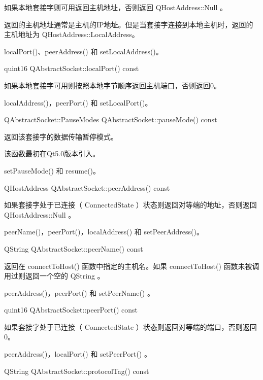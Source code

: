 如果本地套接字则可用返回主机地址，否则返回 QHostAddress::Null 。

返回的主机地址通常是主机的IP地址。但是当套接字连接到本地主机时，返回的主机地址为 QHostAddress::LocalAddress。

\begin{seeAlso}
 localPort()、peerAddress() 和 setLocalAddress()。
\end{seeAlso}

quint16 QAbstractSocket::localPort() const

如果本地套接字可用则按照本地字节顺序返回主机端口，否则返回0。


\begin{seeAlso}
 localAddress()，peerPort() 和 setLocalPort()。
\end{seeAlso}


QAbstractSocket::PauseModes QAbstractSocket::pauseMode() const

返回该套接字的数据传输暂停模式。

该函数最初在Qt5.0版本引入。


\begin{seeAlso}
 setPauseMode() 和 resume()。
\end{seeAlso}

QHostAddress QAbstractSocket::peerAddress() const

如果套接字处于已连接（ ConnectedState ）状态则返回对等端的地址，否则返回 QHostAddress::Null 。


\begin{seeAlso}
peerName()，peerPort()，localAddress() 和 setPeerAddress()。
\end{seeAlso}

QString QAbstractSocket::peerName() const

返回在 connectToHost() 函数中指定的主机名。如果 connectToHost() 函数未被调用过则返回一个空的 QString 。


\begin{seeAlso}
peerAddress()，peerPort() 和 setPeerName() 。
\end{seeAlso}



quint16 QAbstractSocket::peerPort() const


如果套接字处于已连接（ ConnectedState ）状态则返回对等端的端口，否则返回0。

\begin{seeAlso}
peerAddress()，localPort() 和 setPeerPort() 。
\end{seeAlso}

QString QAbstractSocket::protocolTag() const


